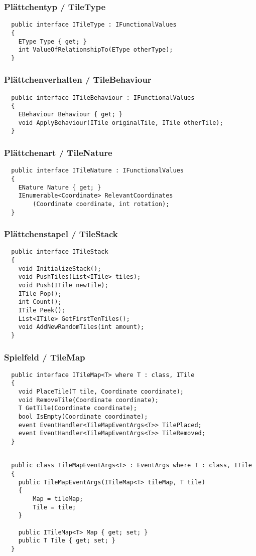\documentclass[../main.tex]{subfiles}
\begin{document}
	\subsubsection{Plättchentyp / TileType}
	\begin{lstlisting}
  public interface ITileType : IFunctionalValues
  {
	EType Type { get; }
	int ValueOfRelationshipTo(EType otherType);
  }
	\end{lstlisting}

	\subsubsection{Plättchenverhalten / TileBehaviour}
	\begin{lstlisting}
  public interface ITileBehaviour : IFunctionalValues
  {
	EBehaviour Behaviour { get; }
	void ApplyBehaviour(ITile originalTile, ITile otherTile);
  }
	\end{lstlisting}

	\subsubsection{Plättchenart / TileNature}
	\begin{lstlisting}
  public interface ITileNature : IFunctionalValues
  {
	ENature Nature { get; }
	IEnumerable<Coordinate> RelevantCoordinates
		(Coordinate coordinate, int rotation);
  }
	\end{lstlisting}

	\subsubsection{Plättchenstapel / TileStack}
	\begin{lstlisting}
  public interface ITileStack
  {
	void InitializeStack();
	void PushTiles(List<ITile> tiles);
	void Push(ITile newTile);
	ITile Pop();
	int Count();
	ITile Peek();
	List<ITile> GetFirstTenTiles();
	void AddNewRandomTiles(int amount);
  }
	\end{lstlisting}

	\subsubsection{Spielfeld / TileMap}
	\begin{lstlisting}
  public interface ITileMap<T> where T : class, ITile
  {
	void PlaceTile(T tile, Coordinate coordinate);
	void RemoveTile(Coordinate coordinate);
	T GetTile(Coordinate coordinate);
	bool IsEmpty(Coordinate coordinate);
	event EventHandler<TileMapEventArgs<T>> TilePlaced;
	event EventHandler<TileMapEventArgs<T>> TileRemoved;
  }
	

	\end{lstlisting}
	\begin{lstlisting}
  public class TileMapEventArgs<T> : EventArgs where T : class, ITile
  {
	public TileMapEventArgs(ITileMap<T> tileMap, T tile)
	{
		Map = tileMap;
		Tile = tile;
	}
	
	public ITileMap<T> Map { get; set; }
	public T Tile { get; set; }
  }
	\end{lstlisting}
\end{document}
